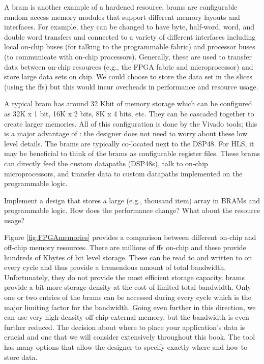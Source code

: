 A \gls{bram} is another example of a hardened resource. \glspl{bram} are configurable random access memory modules that support different memory layouts and interfaces. For example, they can be changed to have byte, half-word, word, and double word transfers and connected to a variety of different interfaces including local on-chip buses (for talking to the programmable fabric) and processor buses (to communicate with on-chip processors). Generally, these are used to transfer data between on-chip resources (e.g., the FPGA fabric and microprocessor) and store large data sets on chip. We could choose to store the data set in the slices (using the \glspl{ff}) but this would incur overheads in performance and resource usage. 

A typical \gls{bram} has around 32 Kbit of memory storage which can be configured as 32K x 1 bit, 16K x 2 bits, 8K x 4 bits, etc. They can be cascaded together to create larger memories. All of this configuration is done by the Vivado tools; this is a major advantage of \VHLS: the designer does not need to worry about these low level details. The \glspl{bram} are typically co-located next to the DSP48. For HLS, it may be beneficial to think of the \glspl{bram} as configurable register files. These \glspl{bram} can directly feed the custom datapaths (DSP48s), talk to on-chip microprocessors, and transfer data to custom datapaths implemented on the programmable logic.

\begin{exercise}
Implement a design that stores a large (e.g., thousand item) array in BRAMs and programmable logic. How does the performance change? What about the resource usage?
\end{exercise}

Figure \ref{fig:FPGAmemories} provides a comparison between different on-chip and off-chip memory resources. There are millions of \glspl{ff} on-chip and these provide hundreds of Kbytes of bit level storage. These can be read to and written to on every cycle and thus provide a tremendous amount of total bandwidth. Unfortunately, they do not provide the most efficient storage capacity. \glspl{bram} provide a bit more storage density at the cost of limited total bandwidth. Only one or two entries of the \glspl{bram} can be accessed during every cycle which is the major limiting factor for the bandwidth. Going even further in this direction, we can use very high density off-chip external memory, but the bandwidth is even further reduced. The decision about where to place your application's data is crucial and one that we will consider extensively throughout this book. The \VHLS tool has many options that allow the designer to specify exactly where and how to store data. 


